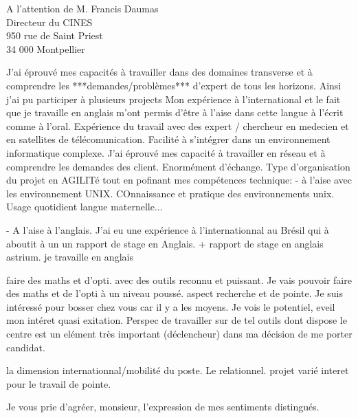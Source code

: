 \documentclass[12pt]{lettre}
\begin{document}
\begin{letter}{A l'attention de M. Francis Daumas\\Directeur du CINES\\950 rue de Saint Priest\\34 000 Montpellier}
{J'ai éprouvé mes capacités à travailler dans des domaines transverse et à
comprendre les ***demandes/problèmes*** d'expert de tous les horizons.
Ainsi j'ai pu participer à plusieurs projects
Mon expérience à l'international et le fait que je travaille en anglais
m'ont permis d'être à l'aise dans cette langue à l'écrit comme à l'oral.
Expérience du travail avec des expert / chercheur en medecien et en satellites de télécomunication. Facilité à s'intégrer dans un environnement informatique complexe. J'ai éprouvé mes capacité à travailler en réseau et à comprendre les demandes des client. Enormément d'échange. Type d'organisation du projet en AGILITé
tout en pofinant mes compétences technique:
 - à l'aise avec les environnement UNIX. COnnaissance et pratique des environnements unix. Usage quotidient langue maternelle...

 - A l'aise à l'anglais. J'ai eu une expérience à l'internationnal au Brésil qui à aboutit à un un rapport de stage en Anglais. + rapport de stage en anglais astrium. je travaille en anglais


}

{
 faire des maths et d'opti. avec des outils reconnu et puissant. Je vais pouvoir faire des maths et de l'opti à un niveau poussé. aspect recherche et de pointe. Je suis intéressé pour bosser chez vous car il y a les moyens. Je vois le potentiel, eveil mon intéret quasi exitation. Perspec de travailler sur de tel outils dont dispose le centre est un elément très important (déclencheur) dans ma décision de me porter candidat.

 la dimension internationnal/mobilité du poste. Le relationnel. projet varié
 interet pour le travail de pointe.
}

\closing{Je vous prie d'agréer, monsieur, l'expression de mes sentiments distingués.}
\end{letter}
\end{document}
